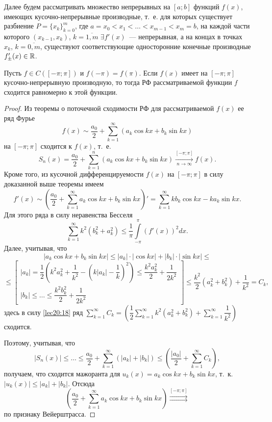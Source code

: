\documentclass[../../main.tex]{subfiles}
\begin{document}
	Далее будем рассматривать множество непрерывных на $ [a; b] $
	функций $ f(x) $, имеющих кусочно-непрерывные производные, т.~е.
	для которых существует разбиение $ P = \{x_k\}_{k = 0}^m $, 
	где $ a = x_0 < x_1 < \dots < x_{m - 1} < x_m = b $, 
	на каждой части которого $(x_{k - 1}, x_k)$, $k = \overline{1, m}$ 
	$ \exists f'(x) $~--- непрерывная, а на концах в точках $ x_k $,
	$ k = \overline{0, m} $, существуют соответствующие односторонние
	конечные производные $f'_\pm(x) \in \mathbb{R}$.
	
	\begin{thm}
		Пусть $ f \in C([-\pi; \pi]) $ и $ f(-\pi) = f(\pi) $. 
		Если $ f(x) $ имеет на $ [-\pi; \pi] $ кусочно-непрерывную 
		производную, то тогда РФ рассматриваемой функции $f$
		сходится равномерно к этой функции.
	\end{thm}
	\begin{proof}
		Из теоремы о поточечной сходимости РФ для рассматриваемой 
		$ f(x) $ ее ряд Фурье 
		\[ f(x) \sim \dfrac{a_0}{2} + \sum\limits_{k = 1}^{\infty}
		(a_k\cos{kx} + b_k\sin{kx}) \]
		на $ [-\pi; \pi] $ сходится к $ f(x) $, т.~е.
		\[
		S_n(x) = \dfrac{a_0}{2} + \sum\limits_{k = 1}^n(
		a_k\cos{kx} + b_k\sin{kx}) 
		\stackrel{[-\pi; \pi]}{\underset{n \to \infty}{\to}} f(x).
		\]
		Кроме того, из кусочной дифференцируемости $ f(x) $ на 
		$ [-\pi; \pi] $ в силу доказанной выше теоремы имеем 
		\[
		f'(x) \sim \left(\dfrac{a_0}{2} + 
		\sum\limits_{k = 1}^\infty a_k\cos kx + b_k\sin kx
		\right)' = \sum\limits_{k = 1}^\infty kb_k\cos kx -
		ka_k\sin kx.
		\]
		Для этого ряда в силу неравенства Бесселя
		\begin{equation}
		\label{lec20:18}
		\sum\limits_{k = 1}^\infty k^2(b_k^2 + a_k^2) \leq
		\dfrac{1}{\pi} \int\limits_{-\pi}^\pi (f'(x))^2 dx.
		\end{equation}
		Далее, учитывая, что
		\[
		|a_k\cos kx + b_k\sin kx| \leq |a_k|\cdot|\cos kx| +
		|b_k|\cdot|\sin kx| \leq \]\[ \leq
		\begin{bmatrix}
		|a_k| = \dfrac{1}{2}\left(
		k^2a_k^2 + \dfrac{1}{k^2} - \left(
		k|a_k| - \dfrac{1}{k}\right)^2
		\right) \leq \dfrac{k^2a_k^2}{2} + \dfrac{1}{2k^2}\\
		|b_k| \leq \dots \leq \dfrac{k^2b_k^2}{2} + \dfrac{1}{2k^2}
		\end{bmatrix} \leq \dfrac{k^2}{2}(a_k^2 + b_k^2) + \dfrac{1}{k^2} = C_k,
		\]
		здесь в силу \eqref{lec20:18} ряд 
		$
		\sum\limits_{k = 1}^\infty C_k =
		\left(
		\dfrac{1}{2} \sum\limits_{k = 1}^\infty 
		k^2(a_k^2 + b_k^2) + \sum\limits_{k = 1}^\infty
		\dfrac{1}{k^2}
		\right)
		$ сходится.
		
		Поэтому, учитывая, что \[|S_n(x)| \leq \dots \leq
		\dfrac{a_0}{2} + \sum\limits_{k = 1}^\infty(|a_k| + |b_k|)  \le
		\left(\dfrac{|a_0|}{2} + \sum\limits_{k = 1}^\infty C_k\right),\]
		получаем, что сходится мажоранта для $ u_k(x) = a_k\cos kx + b_k\sin kx$, 
		т.~к.
		$ |u_k(x)| \leq |a_k| + |b_k| $. Отсюда
		\[\left(
		\dfrac{a_0}{2} + \sum\limits_{k = 1}^\infty a_k\cos kx + b_k\sin kx
		\right) 
		\stackrel{[-\pi; \pi]}{\rightrightarrows}
		\] по признаку Вейерштрасса.
	\end{proof}
\end{document}
